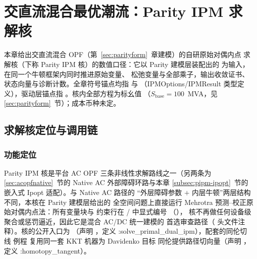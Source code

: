 \section{交直流混合最优潮流：Parity IPM 求解核}\label{sec:parityipm}

本章给出交直流混合 OPF（第~\ref{sec:parityform}~章建模）的自研原始对偶内点
求解核（下称 Parity IPM 核）的数值口径：它以 Parity 建模层装配出的
 为输入，在同一个牛顿框架内同时推进原始变量、
松弛变量与全部乘子，输出收敛证书、状态向量与诊断计数。全章符号锚点均指
 与
（IPMOptions/IPMResult 类型定义），驱动层锚点指
。核内全部方程为标幺值
（$S_{\mathrm{base}}=100$~MVA，见 \ref{sec:parityform}~节）；成本币种未定。

\subsection{求解核定位与调用链}

\subsubsection*{功能定位}
Parity IPM 核是平台 AC OPF 三条非线性求解路线之一（另两条为
\ref{sec:acopfnative}~节的 Native AC 外部障碍环路与本章
\ref{subsec:pipm-ipopt}~节的嵌入式 Ipopt 适配）。与 Native AC 路径的
“外层障碍参数 $+$ 内层牛顿”两层结构不同，本核在 Parity 建模层给出的
全空间问题上直接运行 Mehrotra 预测--校正原始对偶内点法：所有变量块与
约束行在 / 中显式编号
（），
核不再做任何设备级聚合或惩罚逼近，因此它是混合 AC/DC 统一建模的
首选审查路径（
头文件注释）。核的公开入口为
（声明
，定义 :solve\_primal\_dual\_ipm），配套的同伦切线
例程  复用同一套 KKT 机器为 Davidenko 目标
同伦提供路径切向量（声明 ，
定义 :homotopy\_tangent）。


